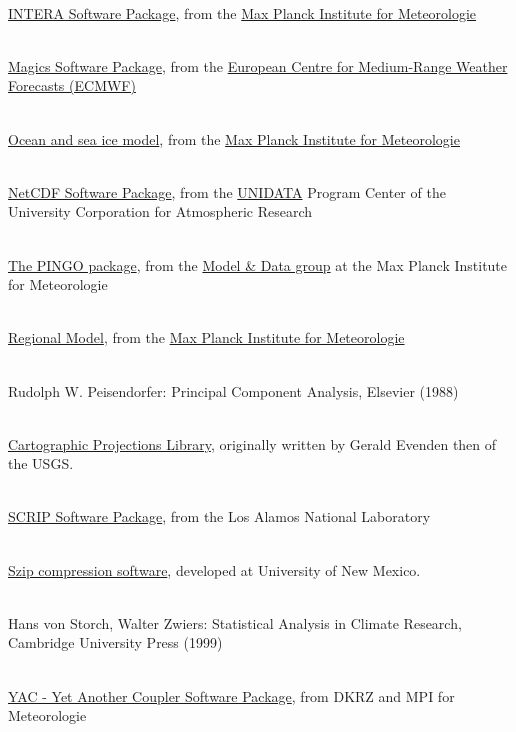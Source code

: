 \begin{thebibliography}{xx}
 \ \\
  \href{http://wekuw.met.fu-berlin.de/~IngoKirchner/nudging/nudging}{INTERA Software Package},
  from the
  \href{http://www.mpimet.mpg.de}
       {Max Planck Institute for Meteorologie}


 \ \\
  \href{https://software.ecmwf.int/wiki/display/MAGP/Magics}
       {Magics Software Package},
  from the
  \href{https://www.ecmwf.int}
       {European Centre for Medium-Range Weather Forecasts (ECMWF)}

 \ \\
  \href{http://www.mpimet.mpg.de/en/wissenschaft/modelle/mpiom/mpiom-description.html}
       {Ocean and sea ice model},
  from the
  \href{http://www.mpimet.mpg.de}
       {Max Planck Institute for Meteorologie}


 \ \\
  \href{https://www.unidata.ucar.edu/software/netcdf}{NetCDF Software Package},
  from the
  \href{https://www.unidata.ucar.edu}{UNIDATA}
  Program Center of the University Corporation for Atmospheric Research


 \ \\
  \href{http://www.mad.zmaw.de/Pingo/post/down/BigPingo.pdf}{The PINGO package},
  from the
  \href{http://www.mad.zmaw.de}{Model \& Data group}
  at the Max Planck Institute for Meteorologie


 \ \\
  \href{http://www.remo-rcm.de/}{Regional Model},
  from the
  \href{http://www.mpimet.mpg.de}
       {Max Planck Institute for Meteorologie}


 \ \\
  Rudolph W. Peisendorfer: Principal Component Analysis, Elsevier (1988)


 \ \\
  \href{https://github.com/OSGeo/proj.4/wiki}{Cartographic Projections Library},
  originally written by Gerald Evenden then of the USGS.


 \ \\
  \href{http://oceans11.lanl.gov/trac/SCRIP}{SCRIP Software Package},
  from the Los Alamos National Laboratory


 \ \\
  \href{http://www.hdfgroup.org/doc_resource/SZIP}{Szip compression software},
  developed at University of New Mexico.


 \ \\
  Hans von Storch, Walter Zwiers: Statistical Analysis in Climate Research, Cambridge University Press (1999)


 \ \\
  \href{https://doc.redmine.dkrz.de/YAC/html}{YAC - Yet Another Coupler Software Package},
  from DKRZ and MPI for Meteorologie

\end{thebibliography}
